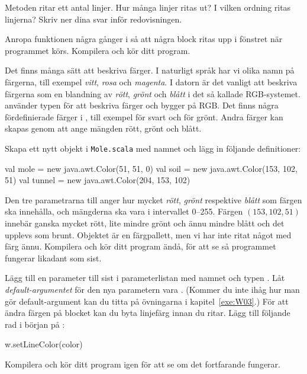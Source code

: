 \Subtask\Pen
Metoden  ritar ett antal linjer.
Hur många linjer ritas ut?
I vilken ordning ritas linjerna?
Skriv ner dina svar inför redovisningen.

\Subtask
Anropa funktionen  några gånger i  så att några block ritas upp i fönstret när programmet körs.
Kompilera och kör ditt program.


\Task
Det finns många sätt att beskriva färger.
I naturligt språk har vi olika namn på färgerna, till exempel \emph{vitt}, \emph{rosa} och \emph{magenta}.
I datorn är det vanligt att beskriva färgerna som en blandning av \emph{rött}, \emph{grönt} och \emph{blått} i det så kallade RGB-systemet.
 använder typen  för att beskriva färger och  bygger på RGB.
Det finns några fördefinierade färger i , till exempel  för svart och  för grönt.
Andra färger kan skapas genom att ange mängden rött, grönt och blått.

\Subtask
Skapa ett nytt objekt i \texttt{Mole.scala} med namnet  och lägg in följande definitioner:
\begin{Code}
val mole   = new java.awt.Color(51, 51, 0)
val soil   = new java.awt.Color(153, 102, 51)
val tunnel = new java.awt.Color(204, 153, 102)
\end{Code}
Den tre parametrarna till  anger hur mycket \emph{rött}, \emph{grönt} respektive \emph{blått} som färgen ska innehålla, och mängderna ska vara i intervallet 0--255.
Färgen $(153, 102, 51)$ innebär ganska mycket rött, lite mindre grönt och ännu mindre blått och det upplevs som brunt.
Objektet  är en färgpallett, men vi har inte ritat något med färg ännu.
Kompilera och kör ditt program ändå, för att se så programmet fungerar likadant som sist.

\Subtask
Lägg till en parameter till  sist i parameterlistan med namnet  och typen .
Låt \emph{default-argumentet} för den nya parametern vara .
(Kommer du inte ihåg hur man gör default-argument kan du titta på övningarna i kapitel~\ref{exe:W03}.)
För att ändra färgen på blocket kan du byta linjefärg innan du ritar.
Lägg till följande rad i början på :
\begin{Code}
w.setLineColor(color)
\end{Code}
Kompilera och kör ditt program igen för att se om det fortfarande fungerar.

